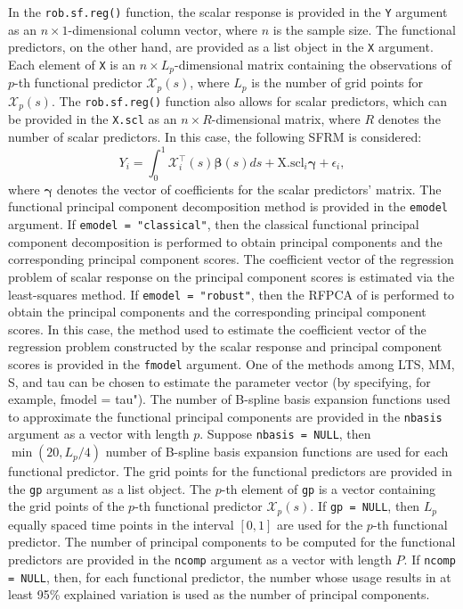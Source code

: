 In the \texttt{rob.sf.reg()} function, the scalar response is provided in the \texttt{Y} argument as an $n \times 1$-dimensional column vector, where $n$ is the sample size. The functional predictors, on the other hand, are provided as a list object in the \texttt{X} argument. Each element of \texttt{X} is an $n \times L_p$-dimensional matrix containing the observations of $p$-th functional predictor $\mathcal{X}_p(s)$, where $L_p$ is the number of grid points for $\mathcal{X}_p(s)$. The \texttt{rob.sf.reg()} function also allows for scalar predictors, which can be provided in the \texttt{X.scl} as an $n \times R$-dimensional matrix, where $R$ denotes the number of scalar predictors. In this case, the following SFRM is considered:
\begin{equation*}
Y_i = \int_0^1 \bm{\mathcal{X}}_i^\top(s) \bm{\beta}(s) ds + \text{X.scl}_i \bm{\gamma} + \epsilon_i,
\end{equation*}
where $\bm{\gamma}$ denotes the vector of coefficients for the scalar predictors' matrix. The functional principal component decomposition method is provided in the \texttt{emodel} argument. If \texttt{emodel = "classical"}, then the classical functional principal component decomposition is performed to obtain principal components and the corresponding principal component scores. The coefficient vector of the regression problem of scalar response on the principal component scores is estimated via the least-squares method. If \texttt{emodel = "robust"}, then the RFPCA of \cite{Bali2011} is performed to obtain the principal components and the corresponding principal component scores. In this case, the method used to estimate the coefficient vector of the regression problem constructed by the scalar response and principal component scores is provided in the \texttt{fmodel} argument. One of the methods among LTS, MM, S, and tau can be chosen to estimate the parameter vector (by specifying, for example, fmodel = tau"). The number of B-spline basis expansion functions used to approximate the functional principal components are provided in the \texttt{nbasis} argument as a vector with length $p$. Suppose \texttt{nbasis = NULL}, then $\min(20, L_p / 4)$ number of B-spline basis expansion functions are used for each functional predictor. The grid points for the functional predictors are provided in the \texttt{gp} argument as a list object. The $p$-th element of \texttt{gp} is a vector containing the grid points of the $p$-th functional predictor $\mathcal{X}_p(s)$. If \texttt{gp = NULL}, then $L_p$ equally spaced time points in the interval $[0,1]$ are used for the $p$-th functional predictor. The number of principal components to be computed for the functional predictors are provided in the \texttt{ncomp} argument as a vector with length $P$. If \texttt{ncomp = NULL}, then, for each functional predictor, the number whose usage results in at least 95\% explained variation is used as the number of principal components.

